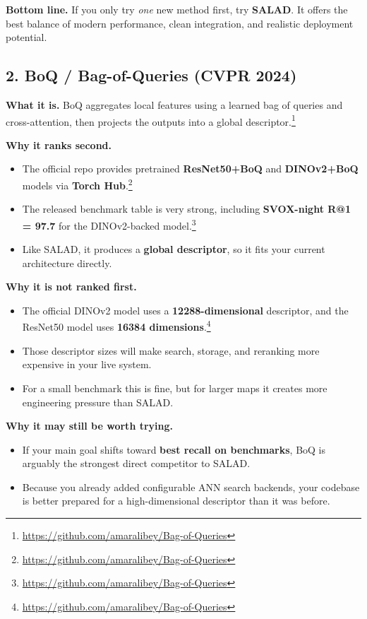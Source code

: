 \documentclass[11pt]{article}
\begin{document}
\textbf{Bottom line.} If you only try \emph{one} new method first, try \textbf{SALAD}. It offers the best balance of modern performance, clean integration, and realistic deployment potential.

\subsection*{2. BoQ / Bag-of-Queries (CVPR 2024)}
\textbf{What it is.} BoQ aggregates local features using a learned bag of queries and cross-attention, then projects the outputs into a global descriptor.\footnote{\url{https://github.com/amaralibey/Bag-of-Queries}}

\textbf{Why it ranks second.}
\begin{itemize}[leftmargin=*]
  \item The official repo provides pretrained \textbf{ResNet50+BoQ} and \textbf{DINOv2+BoQ} models via \textbf{Torch Hub}.\footnote{\url{https://github.com/amaralibey/Bag-of-Queries}}
  \item The released benchmark table is very strong, including \textbf{SVOX-night R@1 = 97.7} for the DINOv2-backed model.\footnote{\url{https://github.com/amaralibey/Bag-of-Queries}}
  \item Like SALAD, it produces a \textbf{global descriptor}, so it fits your current architecture directly.
\end{itemize}

\textbf{Why it is not ranked first.}
\begin{itemize}[leftmargin=*]
  \item The official DINOv2 model uses a \textbf{12288-dimensional} descriptor, and the ResNet50 model uses \textbf{16384 dimensions}.\footnote{\url{https://github.com/amaralibey/Bag-of-Queries}}
  \item Those descriptor sizes will make search, storage, and reranking more expensive in your live system.
  \item For a small benchmark this is fine, but for larger maps it creates more engineering pressure than SALAD.
\end{itemize}

\textbf{Why it may still be worth trying.}
\begin{itemize}[leftmargin=*]
  \item If your main goal shifts toward \textbf{best recall on benchmarks}, BoQ is arguably the strongest direct competitor to SALAD.
  \item Because you already added configurable ANN search backends, your codebase is better prepared for a high-dimensional descriptor than it was before.
\end{itemize}
\end{document}
